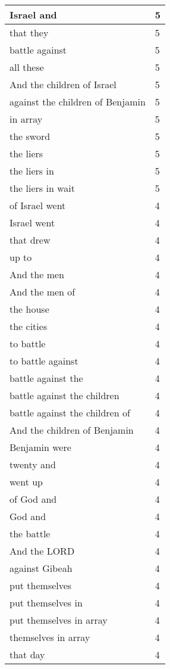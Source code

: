 \begin{center}
\begin{longtable}{|p{3.0in}|p{0.5in}|}
Israel and & 5\\ \hline 
that they & 5\\ \hline 
battle against & 5\\ \hline 
all these & 5\\ \hline 
And the children of Israel & 5\\ \hline 
against the children of Benjamin & 5\\ \hline 
in array & 5\\ \hline 
the sword & 5\\ \hline 
the liers & 5\\ \hline 
the liers in & 5\\ \hline 
the liers in wait & 5\\ \hline 
of Israel went & 4\\ \hline 
Israel went & 4\\ \hline 
that drew & 4\\ \hline 
up to & 4\\ \hline 
And the men & 4\\ \hline 
And the men of & 4\\ \hline 
the house & 4\\ \hline 
the cities & 4\\ \hline 
to battle & 4\\ \hline 
to battle against & 4\\ \hline 
battle against the & 4\\ \hline 
battle against the children & 4\\ \hline 
battle against the children of & 4\\ \hline 
And the children of Benjamin & 4\\ \hline 
Benjamin were & 4\\ \hline 
twenty and & 4\\ \hline 
went up & 4\\ \hline 
of God and & 4\\ \hline 
God and & 4\\ \hline 
the battle & 4\\ \hline 
And the LORD & 4\\ \hline 
against Gibeah & 4\\ \hline 
put themselves & 4\\ \hline 
put themselves in & 4\\ \hline 
put themselves in array & 4\\ \hline 
themselves in array & 4\\ \hline 
that day & 4\\ \hline 

\end{longtable}
\end{center}
